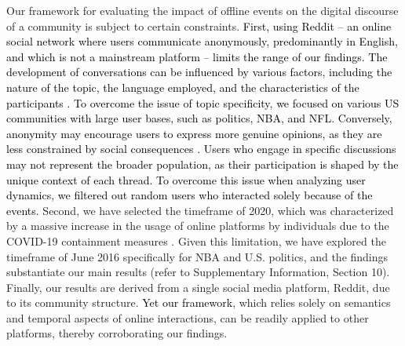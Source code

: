 \documentclass[fleqn,10pt]{wlscirep}
\newcommand{\new}[1]{\textcolor{black}{#1}}
\begin{document}
Our framework for evaluating the impact of offline events on the digital discourse of a community is subject to certain constraints.
\new{
First, using Reddit -- an online social network where users communicate anonymously, predominantly in English, and which is not a mainstream platform -- limits the range of our findings. 
The development of conversations can be influenced by various factors, including the nature of the topic, the language employed, and the characteristics of the participants \cite{stans2017role}.
To overcome the issue of topic specificity, we focused on various US communities with large user bases, such as politics, NBA, and NFL.
Conversely, anonymity may encourage users to express more genuine opinions, as they are less constrained by social consequences \cite{bernstein_4chan_2021}.
Users who engage in specific discussions may not represent the broader population, as their participation is shaped by the unique context of each thread.
To overcome this issue when analyzing user dynamics, we filtered out random users who interacted solely because of the events.
}
Second, we have selected the timeframe of 2020, which was characterized by a massive increase in the usage of online platforms by individuals due to the COVID-19 containment measures \cite{ashokkumar2021social}.
Given this limitation, we have explored the timeframe of June 2016 specifically for NBA and U.S. politics, and the findings substantiate our main results (refer to Supplementary Information, Section 10).
Finally, our results are derived from a single social media platform, Reddit, due to its community structure. 
\new{Yet our framework}, which relies solely on semantics and temporal aspects of online interactions, can be readily applied to other platforms, thereby corroborating our findings.
\end{document}
